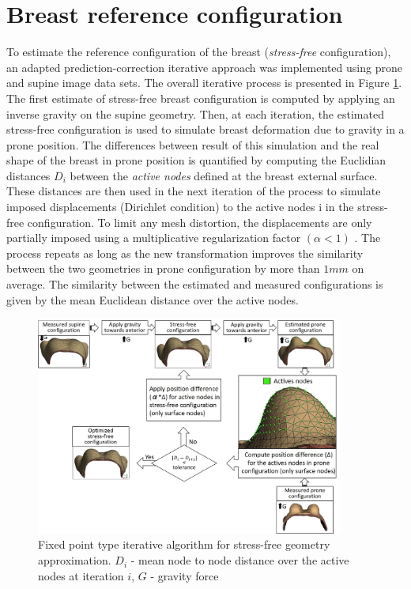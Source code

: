 \section{Breast reference configuration}\label{section:myStressFree}
To estimate the reference configuration of the breast (\textit{stress-free} configuration), an adapted prediction-correction iterative approach was implemented \citep{eiben_breast_2014} using prone and supine image data sets. The overall iterative process is presented in Figure \ref{fig:myfixedpointalgo}. The first estimate of stress-free breast configuration is computed by applying an inverse gravity on the supine geometry. Then, at each iteration, the estimated stress-free configuration is used to simulate breast deformation due to gravity in a prone position. The differences between result of this simulation and the real shape of the breast in prone position is quantified by computing the Euclidian distances $D_i$ between the \textit{active nodes} defined at the breast external surface. These distances are then used in the next iteration of the process to simulate imposed displacements (Dirichlet condition) to the active nodes i in the stress-free configuration. To limit any mesh distortion, the displacements are only partially imposed using a multiplicative regularization factor $ (\alpha <1)$ . The process repeats as long as the new transformation improves the similarity between the two geometries in prone configuration by more than $1mm$ on average. The similarity between the estimated and measured configurations is given by the mean Euclidean distance over the active nodes.                                                              

\begin{figure}[!h]
\centering
\includegraphics[width=0.9\textwidth,keepaspectratio]{figures/stress_free_config_algo.jpg} 
\caption{Fixed point type iterative algorithm for stress-free geometry approximation. $D_i$ - mean node to node distance over the active nodes at iteration $i$, $G$ - gravity force}\label{fig:myfixedpointalgo}
\end{figure}

